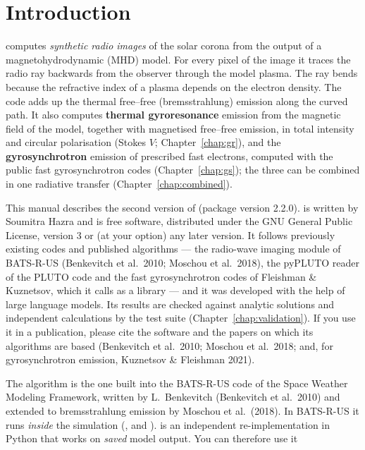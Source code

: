 \chapter{Introduction}

 computes \emph{synthetic radio images} of the solar corona from the
output of a magnetohydrodynamic (MHD) model. For every pixel of the image it
traces the radio ray backwards from the observer through the model plasma.
The ray bends because the refractive index of a plasma depends on the electron
density. The code adds up the thermal free--free (bremsstrahlung) emission along
the curved path. It also computes \textbf{thermal gyroresonance}
emission from the magnetic field of the model, together with magnetised free--free
emission, in total intensity and circular polarisation (Stokes $V$;
Chapter~\ref{chap:gr}), and the \textbf{gyrosynchrotron} emission of
prescribed fast electrons, computed with the public fast gyrosynchrotron codes
(Chapter~\ref{chap:gs}); the three can be combined in one radiative
transfer (Chapter~\ref{chap:combined}).

This manual describes the second version of  (package version 2.2.0).
 is written by Soumitra Hazra and is free software, distributed under
the GNU General Public License, version 3 or (at your option) any later version. It
follows previously existing codes and published algorithms --- the radio-wave imaging
module of BATS-R-US (Benkevitch et al.\ 2010; Moschou et al.\ 2018), the pyPLUTO reader
of the PLUTO code and the fast gyrosynchrotron codes of Fleishman \& Kuznetsov, which it
calls as a library --- and it was developed with the help of large language models. Its
results are checked against analytic solutions and independent calculations by the
test suite (Chapter~\ref{chap:validation}). If you use it in a publication, please cite the
software and the papers on which its algorithms are based (Benkevitch et al.\ 2010;
Moschou et al.\ 2018; and, for gyrosynchrotron emission, Kuznetsov \& Fleishman 2021).

The algorithm is the one built into the BATS-R-US code of the Space Weather Modeling
Framework, written by L.~Benkevitch (Benkevitch et al.\ 2010) and extended to
bremsstrahlung emission by Moschou et al.\ (2018). In BATS-R-US it runs \emph{inside} the
simulation (,  and
).  is an independent re-implementation in Python
that works on \emph{saved} model output. You can therefore use it

